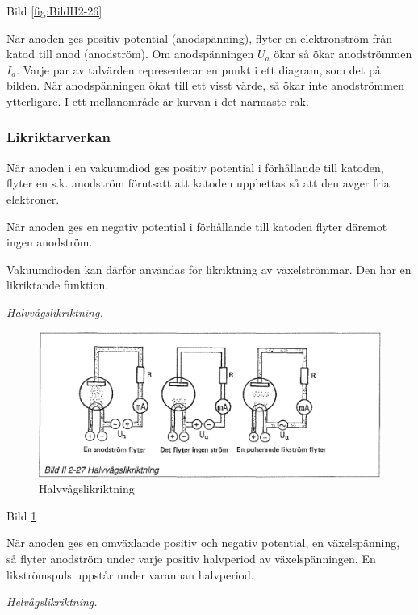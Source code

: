 Bild \ref{fig:BildII2-26}

När anoden ges positiv potential (anodspänning), flyter en elektronström från
katod till anod (anodström). Om anodspänningen \(U_a\) ökar så ökar anodströmmen
\(I_a\). Varje par av talvärden representerar en punkt i ett diagram, som det på
bilden. När anodspänningen ökat till ett visst värde, så ökar inte anodströmmen
ytterligare. I ett mellanområde är kurvan
i det närmaste rak.

\subsubsection{Likriktarverkan}

När anoden i en vakuumdiod ges positiv potential i förhållande till katoden,
flyter en s.k. anodström förutsatt att katoden upphettas så att den avger fria
elektroner.

När anoden ges en negativ potential i förhållande till katoden flyter däremot
ingen anodström.

Vakuumdioden kan därför användas för likriktning av växelströmmar. Den har en
likriktande funktion.

\emph{Halvvågslikriktning.}

\begin{figure}
\includegraphics[width=\textwidth]{images/bild_2_2-27}
\caption{Halvvågslikriktning}
\label{fig:BildII2-27}
\end{figure}

Bild \ref{fig:BildII2-27}

När anoden ges en omväxlande positiv och negativ potential, en växelspänning, så
flyter anodström under varje positiv halvperiod av växelspänningen. En
likströmspuls uppstår under varannan halvperiod.

\emph{Helvågslikriktning.}

